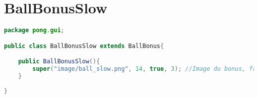 \section{BallBonusSlow}
\begin{lstlisting}[language=Java]
package pong.gui;

public class BallBonusSlow extends BallBonus{

	public BallBonusSlow(){
		super("image/ball_slow.png", 14, true, 3); //Image du bonus, frequence, malus, numBonus
	}
	
}
\end{lstlisting}